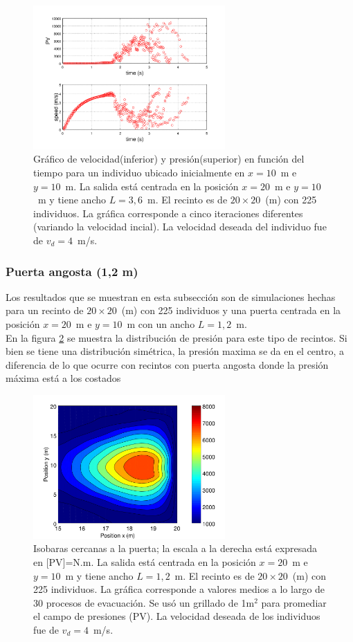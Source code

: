 \begin{figure}[H]
    \centering
    \includegraphics[height=5.5cm]{figuras/pv_vel_t_100_3_6.png}
    \caption[width=5cm]{Gráfico de velocidad(inferior) y presión(superior) en función del tiempo para un individuo ubicado inicialmente en $x=10$~m e $y=10$~m.  La salida está centrada en la posición $x=20$~m e $y=10$~m y tiene ancho $L=3,6$~m. El recinto es de $20\times 20$~(m) con 225 individuos. La gráfica corresponde a cinco iteraciones diferentes (variando la velocidad incial). La velocidad deseada del individuo fue de $v_d=4$~m/s.}
    \label{pv_vel_t_100_3_6}
\end{figure}

\subsubsection{Puerta angosta (1,2 m)}

Los resultados que se muestran en esta subsección son de simulaciones hechas para un recinto de  $20\times 20$~(m) con 225 individuos y una puerta centrada en la posición $x=20$~m e $y=10$~m con un ancho $L=1,2$~m.\\
En la figura \ref{isobaras_1_2m} se muestra la distribución de presión  para este tipo de recintos. Si bien se tiene una distribución simétrica, la presión maxima se da en el centro, a diferencia de lo que ocurre con recintos con puerta angosta donde la presión máxima está a los costados

\begin{figure}[H]
    \centering
    \includegraphics[height=5.5cm]{figuras/press_225p_v4_onedoor_1_2.png}
    \caption[width=5cm]{Isobaras cercanas a la puerta; la escala a la derecha está expresada en [PV]=N.m. La salida está centrada en la posición $x=20$~m e $y=10$~m y tiene ancho $L=1,2$~m. El recinto es de $20\times 20$~(m) con 225 individuos. La gráfica corresponde a valores medios a lo largo de 30 procesos de evacuación. Se usó un grillado de 1m$^2$ para promediar el campo de presiones (PV). La velocidad deseada de los individuos fue de $v_d=4$~m/s.}
    \label{isobaras_1_2m}
\end{figure}

